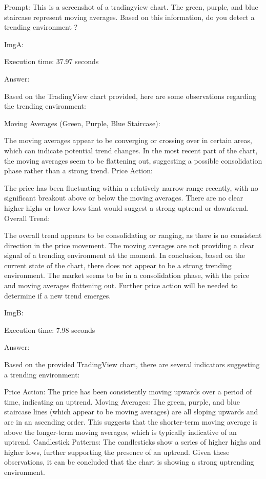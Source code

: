 Prompt:
This is a screenshot of a tradingview chart. The green, purple, and blue staircase represent moving averages. Based on this information, do you detect a trending environment ? 

ImgA:

Execution time: 37.97 seconds

Answer:

Based on the TradingView chart provided, here are some observations regarding the trending environment:

Moving Averages (Green, Purple, Blue Staircase):

The moving averages appear to be converging or crossing over in certain areas, which can indicate potential trend changes.
In the most recent part of the chart, the moving averages seem to be flattening out, suggesting a possible consolidation phase rather than a strong trend.
Price Action:

The price has been fluctuating within a relatively narrow range recently, with no significant breakout above or below the moving averages.
There are no clear higher highs or lower lows that would suggest a strong uptrend or downtrend.
Overall Trend:

The overall trend appears to be consolidating or ranging, as there is no consistent direction in the price movement.
The moving averages are not providing a clear signal of a trending environment at the moment.
In conclusion, based on the current state of the chart, there does not appear to be a strong trending environment. The market seems to be in a consolidation phase, with the price and moving averages flattening out. Further price action will be needed to determine if a new trend emerges.


ImgB: 

Execution time: 7.98 seconds

Answer:

Based on the provided TradingView chart, there are several indicators suggesting a trending environment:

Price Action: The price has been consistently moving upwards over a period of time, indicating an uptrend.
Moving Averages: The green, purple, and blue staircase lines (which appear to be moving averages) are all sloping upwards and are in an ascending order. This suggests that the shorter-term moving average is above the longer-term moving averages, which is typically indicative of an uptrend.
Candlestick Patterns: The candlesticks show a series of higher highs and higher lows, further supporting the presence of an uptrend.
Given these observations, it can be concluded that the chart is showing a strong uptrending environment.



